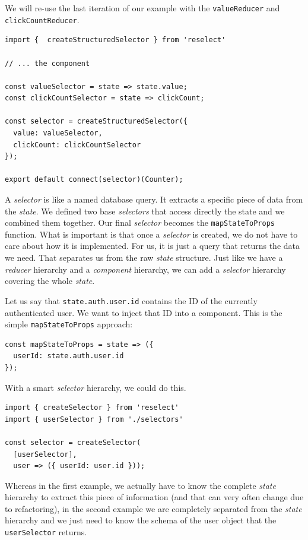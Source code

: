 We will re-use the last iteration of our example with the \texttt{valueReducer} and \texttt{clickCountReducer}.

\begin{verbatim}
import {  createStructuredSelector } from 'reselect'

// ... the component

const valueSelector = state => state.value;
const clickCountSelector = state => clickCount;

const selector = createStructuredSelector({
  value: valueSelector,
  clickCount: clickCountSelector
});

export default connect(selector)(Counter);
\end{verbatim}

A \emph{selector} is like a named database query. It extracts a specific piece of data from the \emph{state}. We defined two base \emph{selectors} that access directly the state and we combined them together. Our final \emph{selector} becomes the \texttt{mapStateToProps} function. What is important is that once a \emph{selector} is created, we do not have to care about how it is implemented. For us, it is just a query that returns the data we need. That separates us from the raw \emph{state} structure. Just like we have a \emph{reducer} hierarchy and a \emph{component} hierarchy, we can add a \emph{selector} hierarchy covering the whole \emph{state}.

Let us say that \texttt{state.auth.user.id} contains the ID of the currently authenticated user. We want to inject that ID into a component. This is the simple \texttt{mapStateToProps} approach:

\begin{verbatim}
const mapStateToProps = state => ({
  userId: state.auth.user.id
});
\end{verbatim}

With a smart \emph{selector} hierarchy, we could do this.

\begin{verbatim}
import { createSelector } from 'reselect'
import { userSelector } from './selectors'

const selector = createSelector(
  [userSelector],
  user => ({ userId: user.id }));
\end{verbatim}

Whereas in the first example, we actually have to know the complete \emph{state} hierarchy to extract this piece of information (and that can very often change due to refactoring), in the second example we are completely separated from the \emph{state} hierarchy and we just need to know the schema of the user object that the \texttt{userSelector} returns.

